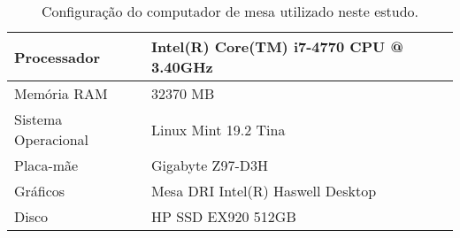 \begin{table}[H]
    \centering
    \caption{Configuração do computador de mesa utilizado neste estudo.}
    
    \begin{center}
    \begin{tabular}{|l|p{3.5cm}|}
        \hline
        Processador
        & Intel(R) Core(TM) i7-4770 CPU @ 3.40GHz
        \\ \hline
        Memória RAM
        & 32370 MB
        \\ \hline
        Sistema Operacional
        & Linux Mint 19.2 Tina
        \\ \hline
        Placa-mãe
        & Gigabyte Z97-D3H
        \\ \hline
        Gráficos
        & Mesa DRI Intel(R) Haswell Desktop
        \\ \hline
        Disco
        & HP SSD EX920 512GB
        \\ \hline
    \end{tabular}
    \end{center}
    \label{tab:sistema-computacional}
\end{table}